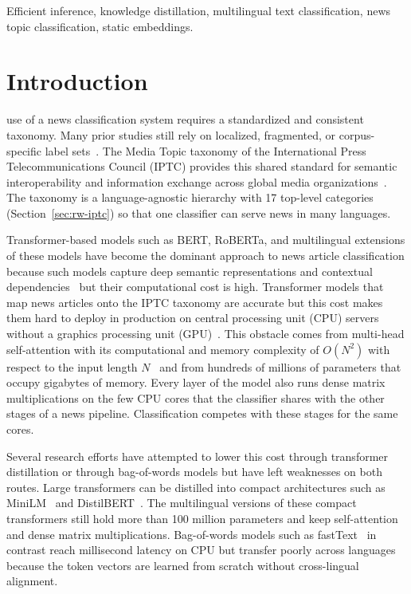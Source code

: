 \documentclass{ieeeaccess}
\begin{document}
\begin{keywords}
Efficient inference, knowledge distillation, multilingual text classification, news topic classification, static embeddings.
\end{keywords}

\titlepgskip=-21pt

\maketitle


\section{Introduction}
\label{sec:introduction}
 use of a news classification system requires a standardized and consistent taxonomy. Many prior studies still rely on localized, fragmented, or corpus-specific label sets~\cite{razuvayevskaya2024peft,adelani2023masakhanews,mirashi2023indicnews}. The Media Topic taxonomy of the International Press Telecommunications Council (IPTC) provides this shared standard for semantic interoperability and information exchange across global media organizations~\cite{iptc2024mediatopics}. The taxonomy is a language-agnostic hierarchy with 17 top-level categories (Section~\ref{sec:rw-iptc}) so that one classifier can serve news in many languages.

Transformer-based models such as BERT, RoBERTa, and multilingual extensions of these models have become the dominant approach to news article classification because such models capture deep semantic representations and contextual dependencies~\cite{razuvayevskaya2024peft,sebok2025babelmachine,kuzman2025llm} but their computational cost is high. Transformer models that map news articles onto the IPTC taxonomy are accurate but this cost makes them hard to deploy in production on central processing unit (CPU) servers without a graphics processing unit (GPU)~\cite{zschache2026energy,treviso2023efficient}. This obstacle comes from multi-head self-attention with its computational and memory complexity of $O(N^2)$ with respect to the input length $N$~\cite{minaee2022dltextclf} and from hundreds of millions of parameters that occupy gigabytes of memory. Every layer of the model also runs dense matrix multiplications on the few CPU cores that the classifier shares with the other stages of a news pipeline. Classification competes with these stages for the same cores.

Several research efforts have attempted to lower this cost through transformer distillation or through bag-of-words models but have left weaknesses on both routes. Large transformers can be distilled into compact architectures such as MiniLM~\cite{wang2021minilmv2} and DistilBERT~\cite{sanh2019distilbert}. The multilingual versions of these compact transformers still hold more than 100 million parameters and keep self-attention and dense matrix multiplications. Bag-of-words models such as fastText~\cite{joulin2017bag} in contrast reach millisecond latency on CPU but transfer poorly across languages because the token vectors are learned from scratch without cross-lingual alignment.
\end{document}

